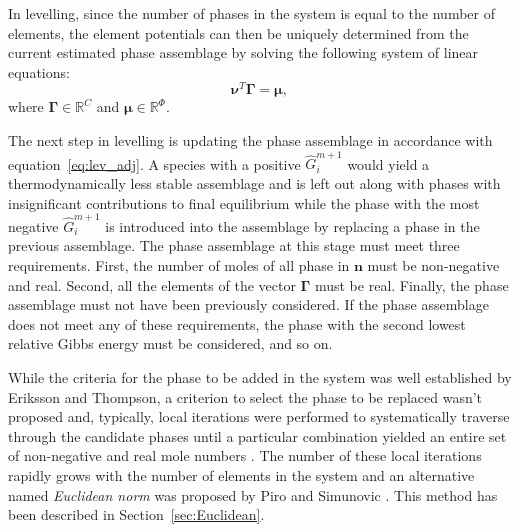 	In levelling, since the number of phases in the system is equal to the number of elements, the element potentials can then be uniquely determined from the current estimated phase assemblage by solving the following system of linear equations:
	\begin{equation} \label{eq:levEP_mat}
		\boldsymbol{\nu}^T \boldsymbol{\Gamma} = \boldsymbol{\mu},
	\end{equation}
	where $\boldsymbol{\Gamma} \in \mathbb{R}^{C} $ and $\boldsymbol{\mu} \in \mathbb{R}^{\Phi}$.

	The next step in levelling is updating the phase assemblage in accordance with equation~\eqref{eq:lev_adj}. A  species with a positive $\hat{G}_i^{m+1}$ would yield a thermodynamically less stable assemblage and is left out along with phases with insignificant contributions to final equilibrium while the phase with the most negative $\hat{G}_i^{m+1}$ is introduced into the assemblage by replacing a phase in the previous assemblage. The phase assemblage at this stage must meet three requirements. First, the number of moles of all phase in $\mathbf{n}$ must be non-negative and real. Second, all the elements of the vector $\boldsymbol{\Gamma}$ must be real. Finally, the phase assemblage must not have been previously considered. If the phase assemblage does not meet any of these requirements, the phase with the second lowest relative Gibbs energy must be considered, and so on.

	While the criteria for the phase to be added in the system was well established by Eriksson and Thompson, a criterion to select the phase to be replaced wasn't proposed and, typically, local iterations were performed to systematically traverse through the candidate phases until a particular combination yielded an entire set of non-negative and real mole numbers \cite{Eriksson89}. The number of these local iterations rapidly grows with the number of elements in the system and an alternative named \emph{Euclidean norm} was proposed by Piro and Simunovic \cite{Piro12a}. This method has been described in Section~\ref{sec:Euclidean}.

